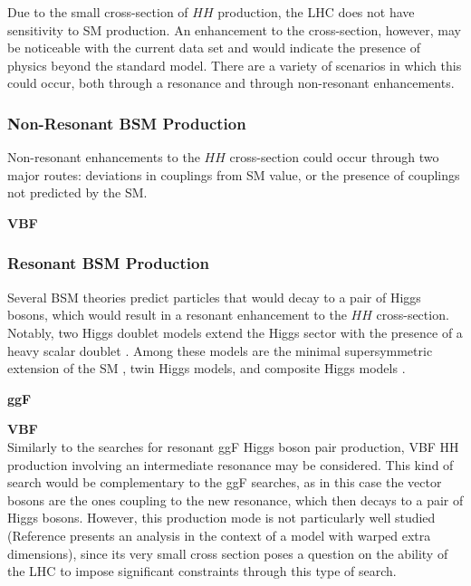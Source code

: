 Due to the small cross-section of $HH$ production, the LHC does not have sensitivity to \gls{SM} production. An enhancement to the cross-section, however, may be noticeable with the current data set and would indicate the presence of physics beyond the standard model. There are a variety of scenarios in which this could occur, both through a resonance and through non-resonant enhancements.

\subsubsection{Non-Resonant BSM Production}

Non-resonant enhancements to the $HH$ cross-section could occur through two major routes: deviations in couplings from \gls{SM} value, or the presence of couplings not predicted by the \gls{SM}.



\noindent\textbf{VBF}\\


\subsubsection{Resonant BSM Production}

Several \gls{BSM} theories predict particles that would decay to a pair of Higgs bosons, which would result in a resonant enhancement to the $HH$ cross-section. Notably, two Higgs doublet models extend the Higgs sector with the presence of a heavy scalar doublet \cite{THDM}. Among these models are the minimal supersymmetric extension of the \gls{SM} \cite{mssm}, twin Higgs models, and composite Higgs models \cite{compositeHiggs}.

\noindent\textbf{\gls{ggF}}\\
\indent

\noindent\textbf{VBF}\\
\indent Similarly to the searches for resonant ggF Higgs boson pair production, VBF HH
production involving an intermediate resonance may be considered. This kind of search would be complementary to the ggF searches, as in this case the vector bosons are the ones coupling to the new resonance, which then decays to a pair of Higgs bosons. However, this production mode is not
particularly well studied (Reference \cite{res_vbf} presents an analysis in the context of a model with warped extra dimensions), since its very small cross section poses a question on the ability of the LHC to impose significant constraints through this type of search.



